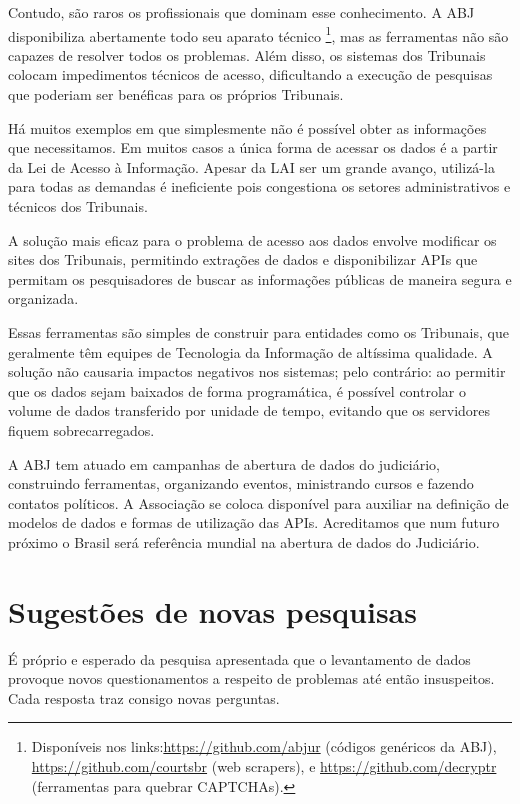 \documentclass[]{report}
\begin{document}
Contudo, são raros os profissionais que dominam esse conhecimento. A ABJ
disponibiliza abertamente todo seu aparato técnico \footnote{Disponíveis
  nos links:\url{https://github.com/abjur} (códigos genéricos da ABJ),
  \url{https://github.com/courtsbr} (web scrapers), e
  \url{https://github.com/decryptr} (ferramentas para quebrar CAPTCHAs).},
mas as ferramentas não são capazes de resolver todos os problemas. Além
disso, os sistemas dos Tribunais colocam impedimentos técnicos de
acesso, dificultando a execução de pesquisas que poderiam ser benéficas
para os próprios Tribunais.

Há muitos exemplos em que simplesmente não é possível obter as
informações que necessitamos. Em muitos casos a única forma de acessar
os dados é a partir da Lei de Acesso à Informação. Apesar da LAI ser um
grande avanço, utilizá-la para todas as demandas é ineficiente pois
congestiona os setores administrativos e técnicos dos Tribunais.

A solução mais eficaz para o problema de acesso aos dados envolve
modificar os sites dos Tribunais, permitindo extrações de dados e
disponibilizar APIs que permitam os pesquisadores de buscar as
informações públicas de maneira segura e organizada.

Essas ferramentas são simples de construir para entidades como os
Tribunais, que geralmente têm equipes de Tecnologia da Informação de
altíssima qualidade. A solução não causaria impactos negativos nos
sistemas; pelo contrário: ao permitir que os dados sejam baixados de
forma programática, é possível controlar o volume de dados transferido
por unidade de tempo, evitando que os servidores fiquem sobrecarregados.

A ABJ tem atuado em campanhas de abertura de dados do judiciário,
construindo ferramentas, organizando eventos, ministrando cursos e
fazendo contatos políticos. A Associação se coloca disponível para
auxiliar na definição de modelos de dados e formas de utilização das
APIs. Acreditamos que num futuro próximo o Brasil será referência
mundial na abertura de dados do Judiciário.

\section{Sugestões de novas
pesquisas}\label{sugestoes-de-novas-pesquisas}

É próprio e esperado da pesquisa apresentada que o levantamento de dados
provoque novos questionamentos a respeito de problemas até então
insuspeitos. Cada resposta traz consigo novas perguntas.
\end{document}
